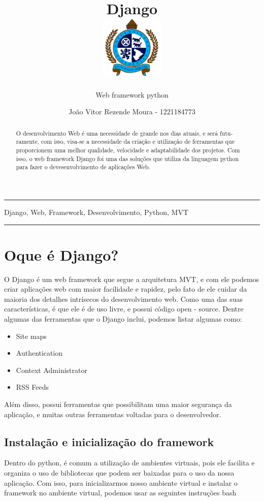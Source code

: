 \documentclass[12pt, a4paper]{paper}
\title{Django \\
  \hfill\includegraphics[height=3cm]{../images/universidade.png}
  \vspace{-3cm}
}
\subtitle{Web framework python}
\author{João Vitor Rezende Moura - 1221184773}
\begin{document}
\maketitle
\hrule
\begin{abstract}
  O desenvolvimento Web é uma necessidade de grande nos dias atuais, e será futu-
  ramente, com isso, visa-se a necessidade da criação e utilização de ferramentas que
  proporcionem uma melhor qualidade, velocidade e adaptabilidade dos projetos.
  Com isso, o web framework Django foi uma das soluções que utiliza da linguagem
  python para fazer o devesenvolvimento de aplicações Web.
\end{abstract}
\begin{keywords}
  Django, Web, Framework, Desenvolvimento, Python, MVT
\end{keywords}

\hrule

\section{Oque é Django?} %
\label{sec:Oque é Django?}
O Django é um web framework que segue a arquitetura MVT, e com ele
podemos criar aplicações web com maior facilidade e rapidez, pelo fato de
ele cuidar da maioria dos detalhes intrísecos do desenvolvimento web. Como
uma das suas características, é que ele é de uso livre, e possui código open -
source.
Dentre algumas das ferramentas que o Django inclui, podemos listar algumas como:

\begin{itemize}
  \item Site maps
  \item Authentication
  \item Context Administrator
  \item RSS Feeds
\end{itemize}

Além disso, possui ferramentas que possibilitam uma maior segurança da
aplicação, e muitas outras ferramentas voltadas para o desenvolvedor.


\subsection{Instalação e inicialização do framework} %
\label{sub:Instalação e inicialização do framework}
Dentro do python, é comum a utilização de ambientes virtuais, pois ele facilita
e organiza o uso de bibliotecas que podem ser baixadas para o uso da nossa
aplicação. Com isso, para inicializarmos nosso ambiente virtual e instalar o
framework no ambiente virtual, podemos usar as seguintes instruções bash
\end{document}
